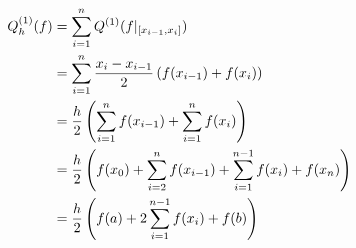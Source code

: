 \begin{align*}
    Q_h^{(1)}(f)
    & = \sum_{i=1}^n Q^{(1)}(f|_{[x_{i-1}, x_i]}) \\
    & = \sum_{i=1}^n
        \frac{x_i - x_{i-1}}{2}
        \left ( 
            f(x_{i-1}) +
            f(x_i)
         \right ) \\
    & = \frac{h}{2}
        \left ( 
            \sum_{i=1}^n f(x_{i-1}) +
            \sum_{i=1}^n f(x_i)
         \right ) \\
    & = \frac{h}{2}
        \left ( 
            f(x_0) +
            \sum_{i=2}^n f(x_{i-1}) +
            \sum_{i=1}^{n-1} f(x_i) +
            f(x_n)
         \right ) \\
    & = \frac{h}{2}
        \left ( 
            f(a) +
            2 \sum_{i=1}^{n-1} f(x_i) +
            f(b)
         \right ) \\
\end{align*}